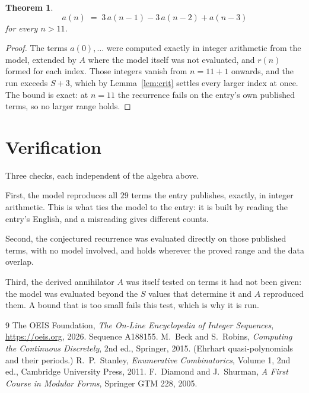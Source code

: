 \documentclass[11pt,a4paper]{article}
\theoremstyle{plain}
\newtheorem{theorem}{Theorem}
\theoremstyle{definition}
\begin{document}
\begin{theorem}
\[
a(n)\;=\;3\,a(n-1) - 3\,a(n-2) + a(n-3)
\]
for every $n>11$.
\end{theorem}

\begin{proof}
The terms $a(0),\dots$ were computed exactly in integer arithmetic from the model, extended by
$A$ where the model itself was not evaluated, and $r(n)$ formed for each index. Those integers
vanish from $n=11+1$ onwards, and the run exceeds $S+3$, which by
Lemma~\ref{lem:crit} settles every larger index at once. The bound is exact: at $n=11$ the recurrence fails on the entry's own published terms, so no larger range holds.
\end{proof}

\section{Verification}

Three checks, each independent of the algebra above.

First, the model reproduces all $29$ terms the entry publishes, exactly, in integer
arithmetic. This is what ties the model to the entry: it is built by reading the entry's
English, and a misreading gives different counts.

Second, the conjectured recurrence was evaluated directly on those published terms, with no
model involved, and holds wherever the proved range and the data overlap.

Third, the derived annihilator $A$ was itself tested on terms it had not been given: the model
was evaluated beyond the $S$ values that determine it and $A$ reproduced them. A bound that is
too small fails this test, which is why it is run.

\begin{thebibliography}{9}
 The OEIS Foundation, \emph{The On-Line Encyclopedia of Integer
Sequences}, \url{https://oeis.org}, 2026. Sequence A188155.
 M.~Beck and S.~Robins, \emph{Computing the Continuous Discretely},
2nd ed., Springer, 2015. (Ehrhart quasi-polynomials and their periods.)
 R.~P.~Stanley, \emph{Enumerative Combinatorics}, Volume 1, 2nd ed.,
Cambridge University Press, 2011.
 F.~Diamond and J.~Shurman, \emph{A First Course in Modular Forms},
Springer GTM 228, 2005.
\end{thebibliography}
\end{document}
